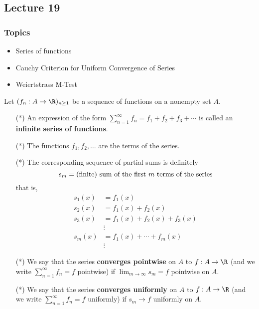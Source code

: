 \subsection{Lecture 19}

\subsubsection{Topics}

\begin{itemize}
    \item Series of functions
    \item Cauchy Criterion for Uniform Convergence of Series
    \item Weiertstrass M-Test
\end{itemize}


\begin{definition}\label{Infinite Series of Functions}
    Let \( ({f}_{n} : A \to \R )_{n \geq 1} \) be a sequence of functions on a nonempty set \( A  \). 
    \begin{enumerate}
        \item[(*)] An expression of the form \( \sum_{ n=1  }^{ \infty  } {f}_{n} = {f}_{1} + {f}_{2} + {f}_{3} + \cdots  \) is called an \textbf{infinite series of functions}.
        \item[(*)] The functions \( {f}_{1}, {f}_{2}, \dots \) are the terms of the series. 
        \item[(*)] The corresponding  sequence of partial sums is definitely 
            \[  {s}_{m} = \text{(finite) sum of the first \( m  \) terms of the series} \]
            that is, 
            \begin{align*}
                {s}_{1}(x) &= {f}_{1}(x) \\
                {s}_{2}(x) &= {f}_{1}(x) + {f}_{2}(x) \\
                {s}_{3}(x) &= {f}_{1}(x) + {f}_{2}(x) + {f}_{3}(x) \\
                           &\vdots \\
                {s}_{m}(x) &= {f}_{1}(x) + \cdots + {f}_{m}(x) \\
                           &\vdots 
            \end{align*}
        \item[(*)] We say that the series \textbf{converges pointwise} on \( A  \) to \( f: A \to \R  \) (and we write \( \sum_{ n=1  }^{ \infty  } {f}_{n} = f  \) pointwise) if \( \lim_{ m \to \infty  }  {s}_{m} = f  \) pointwise on \( A \).
        \item[(*)] We say that the series \textbf{converges uniformly} on \( A  \) to \( f: A \to \R  \) (and we write \( \sum_{ n=1  }^{ \infty  } {f}_{n} = f  \) uniformly) if \( {s}_{m} \to f  \) uniformly on \( A  \). 
    \end{enumerate}
\end{definition}


